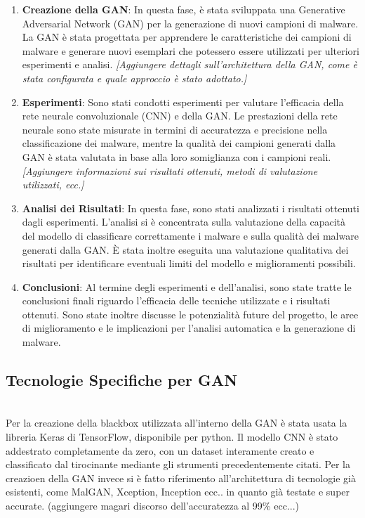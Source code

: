 \begin{enumerate}
    \item \textbf{Creazione della GAN}: In questa fase, è stata sviluppata una Generative Adversarial Network (GAN) per la generazione di nuovi campioni di malware. La GAN è stata progettata per apprendere le caratteristiche dei campioni di malware e generare nuovi esemplari che potessero essere utilizzati per ulteriori esperimenti e analisi. \textit{[Aggiungere dettagli sull'architettura della GAN, come è stata configurata e quale approccio è stato adottato.]} 
    
    \item \textbf{Esperimenti}: Sono stati condotti esperimenti per valutare l'efficacia della rete neurale convoluzionale (CNN) e della GAN. Le prestazioni della rete neurale sono state misurate in termini di accuratezza e precisione nella classificazione dei malware, mentre la qualità dei campioni generati dalla GAN è stata valutata in base alla loro somiglianza con i campioni reali. \textit{[Aggiungere informazioni sui risultati ottenuti, metodi di valutazione utilizzati, ecc.]}
    
    \item \textbf{Analisi dei Risultati}: In questa fase, sono stati analizzati i risultati ottenuti dagli esperimenti. L'analisi si è concentrata sulla valutazione della capacità del modello di classificare correttamente i malware e sulla qualità dei malware generati dalla GAN. È stata inoltre eseguita una valutazione qualitativa dei risultati per identificare eventuali limiti del modello e miglioramenti possibili.
    
    \item \textbf{Conclusioni}: Al termine degli esperimenti e dell'analisi, sono state tratte le conclusioni finali riguardo l'efficacia delle tecniche utilizzate e i risultati ottenuti. Sono state inoltre discusse le potenzialità future del progetto, le aree di miglioramento e le implicazioni per l'analisi automatica e la generazione di malware.
\end{enumerate}


\subsection{Tecnologie Specifiche per GAN}
~\\
\indent Per la creazione della blackbox utilizzata all'interno della GAN è stata usata la libreria Keras di TensorFlow, disponibile per python. Il modello CNN è stato addestrato completamente da zero, con un dataset interamente creato e classificato dal tirocinante mediante gli strumenti precedentemente citati. Per la creazioen della GAN invece si è fatto riferimento all'architettura di tecnologie già esistenti, come MalGAN, Xception, Inception ecc.. in quanto già testate e super accurate. (aggiungere magari discorso dell'accuratezza al 99\% ecc...)


